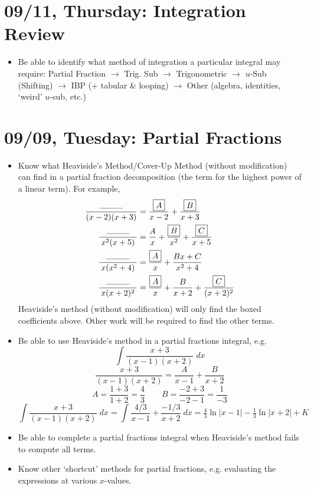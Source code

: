 \documentclass[11pt,letterpaper]{article}
\begin{document}
\newpage
\section*{09/11, Thursday: Integration Review\label{09-11}}

\begin{itemize}
\item Be able to identify what method of integration a particular integral may require: Partial Fraction $\to$ Trig. Sub $\to$ Trigonometric $\to$ $u$-Sub (Shifting) $\to$ IBP (+ tabular \& looping) $\to$ Other (algebra, identities, `weird' $u$-sub, etc.)
\end{itemize}

\newpage
\section*{09/09, Tuesday: Partial Fractions\label{09-09}}

\begin{itemize}
\item Know what Heaviside's Method/Cover-Up Method (without modification) can find in a partial fraction decomposition (the term for the highest power of a linear term). For example, 
	\[
	\begin{aligned}
	\dfrac{\;\;\;\rule{1cm}{0.3pt}\;\;\;}{(x - 2)(x + 3)}&= \dfrac{\boxed{A}}{x - 2} + \dfrac{\boxed{B}}{x + 3} \\
	\dfrac{\;\;\;\rule{1cm}{0.3pt}\;\;\;}{x^2(x + 5)}&= \dfrac{A}{x} + \dfrac{\boxed{B}}{x^2} + \dfrac{\boxed{C}}{x + 5} \\
	\dfrac{\;\;\;\rule{1cm}{0.3pt}\;\;\;}{x(x^2 + 4)}&= \dfrac{\boxed{A}}{x} + \dfrac{Bx + C}{x^2 + 4} \\
	\dfrac{\;\;\;\rule{1cm}{0.3pt}\;\;\;}{x(x + 2)^2}&= \dfrac{\boxed{A}}{x} + \dfrac{B}{x + 2} + \dfrac{\boxed{C}}{(x + 2)^2}
	\end{aligned}
	\]
Heaviside's method (without modification) will only find the boxed coefficients above. Other work will be required to find the other terms. 

\item Be able to use Heaviside's method in a partial fractions integral, e.g. 
	\[
	\int \dfrac{x + 3}{(x - 1)(x + 2)} \;dx
	\]
	\[
	\dfrac{x + 3}{(x - 1)(x + 2)}= \dfrac{A}{x - 1} + \dfrac{B}{x + 2}
	\]
	\[
	A= \dfrac{1 + 3}{1 + 2}= \dfrac{4}{3} \qquad B= \dfrac{-2 + 3}{-2 - 1}= \dfrac{1}{-3}
	\]
	\[
	\int \dfrac{x + 3}{(x - 1)(x + 2)} \;dx= \int \dfrac{4/3}{x - 1} + \dfrac{-1/3}{x + 2} \;dx= \tfrac{4}{3} \ln|x - 1| - \tfrac{1}{3} \ln|x + 2| + K
	\]

\item Be able to complete a partial fractions integral when Heaviside's method fails to compute all terms. 

\item Know other `shortcut' methods for partial fractions, e.g. evaluating the expressions at various $x$-values. 
\end{itemize}
\end{document}
